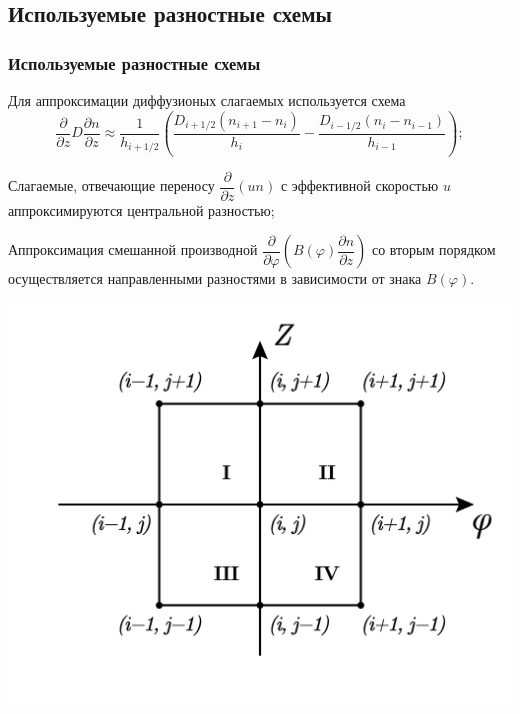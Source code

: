 \documentclass[9pt, apectratio=43,unicode]{beamer}
\begin{document}
\subsection{Используемые разностные схемы}
\begin{frame}\frametitle{Используемые разностные схемы}
\begin{itemize}
\item[•] Для аппроксимации диффузионых слагаемых используется схема $$\dfrac{\partial}{\partial z}D\dfrac{\partial n}{\partial z} \approx \dfrac{1}{h_{i+1/2}}\left(\dfrac{D_{i+1/2}(n_{i+1}-n_i)}{h_i}-\dfrac{D_{i-1/2}(n_{i}-n_{i-1})}{h_{i-1}}\right);$$

\item[•] Слагаемые, отвечающие переносу $\dfrac{\partial}{\partial z}(u n)$ с эффективной скоростью $u$ аппроксимируются центральной разностью;

\smallskip

\parbox[b][5cm][t]{50mm}{
\item[•] Аппроксимация смешанной производной $\dfrac{\partial}{\partial\varphi}\left(B(\varphi)\dfrac{\partial n}{\partial z}\right)$ со вторым порядком осуществляется направленными разностями в зависимости от знака $B(\varphi)$.
}
\hfill
\parbox[b][5cm][t]{60mm}{
\includegraphics[scale = 0.3]{square}
}

\end{itemize}
\end{frame}
\end{document}
